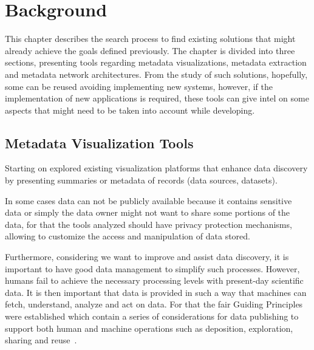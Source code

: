 \chapter{Background}
\label{chapter:background}
\graphicspath{{figs/02-background/}}

This chapter describes the search process to find existing solutions that might already achieve the goals defined previously.
The chapter is divided into three sections, presenting tools regarding metadata visualizations, metadata extraction and metadata network architectures.
From the study of such solutions, hopefully, some can be reused avoiding implementing new systems, however, if the implementation of new applications is required, these tools can give intel on some aspects that might need to be taken into account while developing.

\section{Metadata Visualization Tools} \label{sec:viz-tools}


Starting on explored existing visualization platforms that enhance data discovery
by presenting summaries or metadata of records (data sources, datasets).

In some cases data can not be publicly available because it contains sensitive data or
simply the data owner might not want to share some portions of the data, for that the
tools analyzed should have privacy protection mechanisms, allowing to customize the
access and manipulation of data stored.

Furthermore, considering we want to improve and assist data discovery, it is important to have good data management to simplify such processes.
However, humans fail to achieve the necessary processing levels with present-day
scientific data.
It is then important that data is provided in such a way that machines can fetch,
understand, analyze and act on data.
For that the \gls{fair} Guiding Principles were established which contain a series of considerations for data publishing to support both human and machine operations such as deposition, exploration, sharing and reuse~\cite{fair}.


